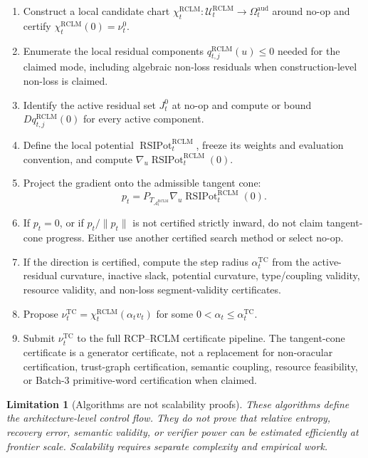 \documentclass[11pt,a4paper]{article}
\newtheorem{limitation}[theorem]{Limitation}
\newcommand{\Acal}{\mathcal A}
\newcommand{\RCLM}{\mathrm{RCLM}}
\newcommand{\aud}{\mathrm{aud}}
\newcommand{\TC}{\mathrm{TC}}
\newcommand{\RSIPot}{\operatorname{RSIPot}}
\begin{document}
\begin{enumerate}[label=\textbf{T\arabic*.}, leftmargin=2em]
    \item Construct a local candidate chart \(\chi_t^{\RCLM}:\mathcal U_t^{\RCLM}\to\Omega_t^{\aud}\) around no-op and certify \(\chi_t^{\RCLM}(0)=\nu_t^0\).
    \item Enumerate the local residual components \(q_{t,j}^{\RCLM}(u)\le0\) needed for the claimed mode, including algebraic non-loss residuals when construction-level non-loss is claimed.
    \item Identify the active residual set \(J_t^0\) at no-op and compute or bound \(Dq_{t,j}^{\RCLM}(0)\) for every active component.
    \item Define the local potential \(\RSIPot_t^{\RCLM}\), freeze its weights and evaluation convention, and compute \(\nabla_u\RSIPot_t^{\RCLM}(0)\).
    \item Project the gradient onto the admissible tangent cone:
    \[
    p_t=P_{T_{\Acal_t^{\RCLM}}}\nabla_u\RSIPot_t^{\RCLM}(0).
    \]
    \item If \(p_t=0\), or if \(p_t/\|p_t\|\) is not certified strictly inward, do not claim tangent-cone progress.  Either use another certified search method or select no-op.
    \item If the direction is certified, compute the step radius \(\alpha_t^{\TC}\) from the active-residual curvature, inactive slack, potential curvature, type/coupling validity, resource validity, and non-loss segment-validity certificates.
    \item Propose \(\nu_t^{\TC}=\chi_t^{\RCLM}(\alpha_t v_t)\) for some \(0<\alpha_t\le\alpha_t^{\TC}\).
    \item Submit \(\nu_t^{\TC}\) to the full RCP--RCLM certificate pipeline.  The tangent-cone certificate is a generator certificate, not a replacement for non-oracular certification, trust-graph certification, semantic coupling, resource feasibility, or Batch-3 primitive-word certification when claimed.
\end{enumerate}

\begin{limitation}[Algorithms are not scalability proofs]
These algorithms define the architecture-level control flow.  They do not prove that relative entropy, recovery error, semantic validity, or verifier power can be estimated efficiently at frontier scale.  Scalability requires separate complexity and empirical work.
\end{limitation}
\end{document}

